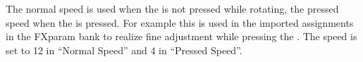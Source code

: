 The normal speed is used when the \vpot is not
pressed while rotating, the pressed speed when the \vpot is
pressed. For example this is
used in the imported assignments in the FXparam bank to realize fine adjustment
while pressing the \vpots. The speed is set to 12 in ``Normal Speed'' and 4 in
``Pressed Speed''.



